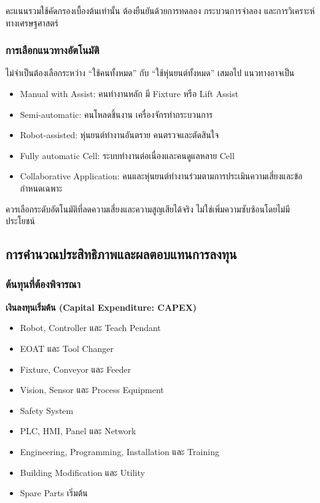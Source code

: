 คะแนนรวมใช้คัดกรองเบื้องต้นเท่านั้น ต้องยืนยันด้วยการทดลอง กระบวนการจำลอง และการวิเคราะห์ทางเศรษฐศาสตร์

\subsubsection{การเลือกแนวทางอัตโนมัติ}

ไม่จำเป็นต้องเลือกระหว่าง “ใช้คนทั้งหมด” กับ “ใช้หุ่นยนต์ทั้งหมด” เสมอไป แนวทางอาจเป็น

\begin{itemize}
    \item Manual with Assist: คนทำงานหลัก มี Fixture หรือ Lift Assist
    \item Semi-automatic: คนโหลดชิ้นงาน เครื่องจักรทำกระบวนการ
    \item Robot-assisted: หุ่นยนต์ทำงานอันตราย คนตรวจและตัดสินใจ
    \item Fully automatic Cell: ระบบทำงานต่อเนื่องและคนดูแลหลาย Cell
    \item Collaborative Application: คนและหุ่นยนต์ทำงานร่วมตามการประเมินความเสี่ยงและข้อกำหนดเฉพาะ
\end{itemize}

ควรเลือกระดับอัตโนมัติที่ลดความเสี่ยงและความสูญเสียได้จริง ไม่ใช่เพิ่มความซับซ้อนโดยไม่มีประโยชน์



\subsection{การคำนวณประสิทธิภาพและผลตอบแทนการลงทุน}

\subsubsection{ต้นทุนที่ต้องพิจารณา}

\textbf{เงินลงทุนเริ่มต้น (Capital Expenditure: CAPEX)}

\begin{itemize}
    \item Robot, Controller และ Teach Pendant
    \item EOAT และ Tool Changer
    \item Fixture, Conveyor และ Feeder
    \item Vision, Sensor และ Process Equipment
    \item Safety System
    \item PLC, HMI, Panel และ Network
    \item Engineering, Programming, Installation และ Training
    \item Building Modification และ Utility
    \item Spare Parts เริ่มต้น
\end{itemize}

